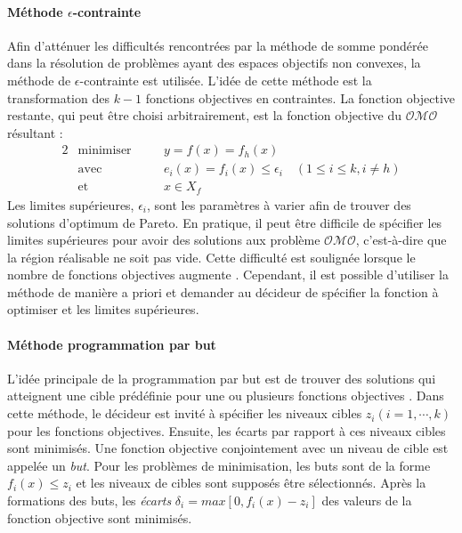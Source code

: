 \paragraph{Méthode $\epsilon$-contrainte}
Afin d'atténuer les difficultés rencontrées par la méthode de somme pondérée dans la résolution de problèmes ayant des espaces objectifs non convexes, la méthode de $\epsilon$-contrainte est utilisée. L'idée de cette méthode est la transformation des $k-1$ fonctions objectives en contraintes. La fonction objective restante, qui peut être choisi arbitrairement, est la fonction objective du $\mathcal{OMO}$ résultant \cite{Haimes71,Vira83} :
\begin{alignat}{2}
& \text{minimiser} \quad && y = f(x) = f_h(x) \nonumber \\
& \text{avec}   \quad && e_i(x) = f_i(x) \leqslant \epsilon_i \quad (1 \leqslant i \leqslant k, i \neq h)  \nonumber \\
& \text{et}   \quad && x \in X_f
\end{alignat}
Les limites supérieures, $\epsilon_i$, sont les paramètres à varier afin de trouver des solutions d'optimum de Pareto. En pratique, il peut être difficile de spécifier les limites supérieures pour avoir des solutions aux problème $\mathcal{OMO}$, c'est-à-dire que la région réalisable ne soit pas vide. Cette difficulté est soulignée lorsque le nombre de fonctions objectives augmente \cite{Branke08}. Cependant, il est possible d'utiliser la méthode de manière a priori et demander au décideur de spécifier la fonction à optimiser et les limites supérieures.

\paragraph{Méthode programmation par but}
L'idée principale de la programmation par but est de trouver des solutions qui atteignent une cible prédéfinie pour une ou plusieurs fonctions objectives \cite{Charnes55}. Dans cette méthode, le décideur est invité à spécifier les niveaux cibles $z_i (i = 1, \cdots, k)$ pour les fonctions objectives. Ensuite, les écarts par rapport à ces niveaux cibles sont minimisés. Une fonction objective conjointement avec un niveau de cible est appelée un \textit{but}. Pour les problèmes de minimisation, les buts sont de la forme $f_i(x) \leqslant z_i$ et les niveaux de cibles sont supposés être sélectionnés. Après la formations des buts, les \textit{écarts} $\delta_i = max[0, f_i(x) - z_i]$ des valeurs de la fonction objective sont minimisés.

